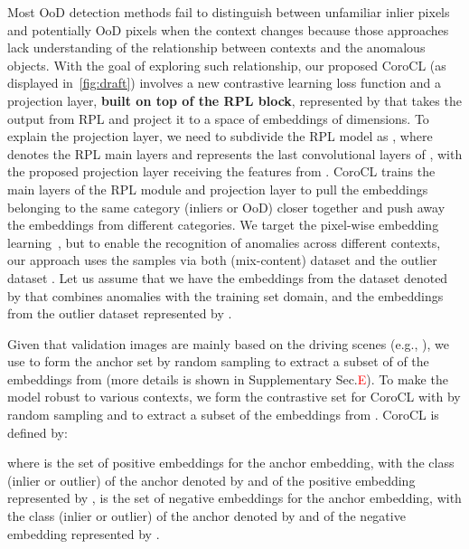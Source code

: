 \documentclass[10pt,twocolumn,letterpaper]{article}
\begin{document}
Most OoD detection methods fail to distinguish between unfamiliar inlier pixels and potentially OoD pixels when the context changes because those approaches lack understanding of the relationship between contexts and the anomalous objects. 
With the goal of exploring such relationship, 
our proposed CoroCL (as displayed in~\cref{fig:draft}) involves a new contrastive learning loss function and a projection layer, \textbf{built on top of the RPL block},  
represented by  
that takes the output from RPL and project it to a space of  embeddings of  dimensions.
To explain the projection layer, we need to subdivide the RPL model as , where  denotes the RPL main layers and  represents the last convolutional layers of , with the proposed projection layer receiving the features from .
CoroCL trains the main layers of the RPL module and projection layer to pull the embeddings belonging to the same category (inliers or OoD) closer together and push away the embeddings from different categories. 
We target the pixel-wise embedding learning~\cite{wang2021dense,wang2021exploring}, but to enable the recognition of anomalies across different contexts, our approach uses the samples via both  (mix-content) dataset  and the outlier dataset .
Let us assume that we have the embeddings from the  dataset denoted by  that combines anomalies with the training set domain, 
and the embeddings from the outlier dataset represented by . 



















Given that validation images are
mainly based on the driving scenes (e.g., ), we use  to 
form the anchor set  by random sampling   to extract a subset of of the embeddings from  (more details is shown in Supplementary Sec.\textcolor{red}{E}). 
To make the model robust to various contexts, we form the contrastive set for CoroCL with 
 by random sampling   and  to extract a subset of the embeddings from . 
CoroCL is defined by:

where  is the set of positive embeddings for the anchor embedding, with the class (inlier or outlier) of the anchor denoted by  and of the positive embedding represented by ,
 is the set of negative embeddings for the anchor embedding, with the class (inlier or outlier) of the anchor denoted by  and of the negative embedding represented by . 
\end{document}
